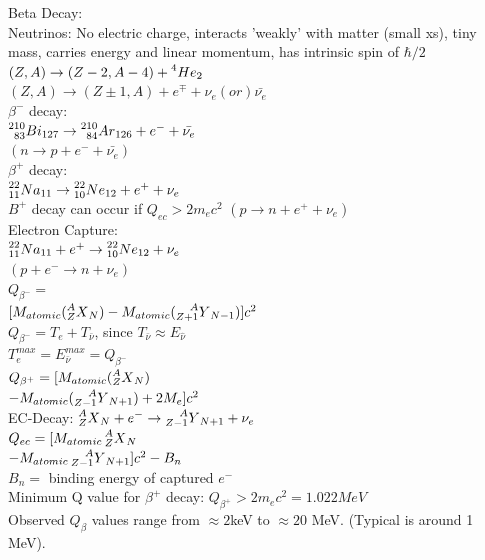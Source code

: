 \documentclass{article}
\begin{document}
\begin{multicols}{3}
Beta Decay:\\
Neutrinos: No electric charge, interacts 'weakly' with matter (small xs), tiny mass, carries energy and linear momentum, has intrinsic spin of $\hbar /2$\\
$(Z,A) \rightarrow (Z-2,A-4) + \prescript{4}{}{He}_{2}$\\
$(Z,A) \rightarrow (Z\pm 1, A) + e^{\mp} + \nu_{e} (or) \bar{\nu_{e}}$\\
$\beta^{-}$ decay: \\
\hspace*{0.01\textwidth} $\prescript{210}{83}{Bi}_{127} \rightarrow \prescript{210}{84}{Ar}_{126} + e^{-} + \bar{\nu_{e}}$\\
\hspace*{0.01\textwidth} $(n\rightarrow p + e^{-} + \bar{\nu_{e}})$\\
$\beta^{+}$ decay: \\
\hspace*{0.01\textwidth} $\prescript{22}{11}{Na}_{11} \rightarrow \prescript{22}{10}{Ne}_{12} + e^{+} + \nu_{e}$\\
$B^{+}$ decay can occur if $Q_{ec} > 2m_{e}c^{2}$
\hspace*{0.01\textwidth} $(p\rightarrow n + e^{+} + \nu_{e})$\\
Electron Capture:\\
\hspace*{0.01\textwidth} $\prescript{22}{11}{Na}_{11} + e^{+} \rightarrow \prescript{22}{10}{Ne}_{12} + \nu_{e}$\\
\hspace*{0.01\textwidth} $(p + e^{-}\rightarrow n + \nu_{e})$\\
$Q_{\beta^{-}} = $\\$[M_{atomic}(\prescript{A}{Z}{X}_{N})-M_{atomic}(\prescript{A}{Z+1}{Y}_{N-1})]c^{2}$\\
$Q_{\beta^{-}} = T_{e} + T_{\bar{\nu}}$, since $T_{\bar{\nu}} \approx E_{\hat{\nu}}$\\
$T_{e}^{max} = E_{\bar{\nu}}^{max} = Q_{\beta^{-}}$\\
$Q_{\beta^{+}} = [M_{atomic}(\prescript{A}{Z}{X}_{N})$\\$ - M_{atomic}(\prescript{A}{Z-1}{Y}_{N+1}) + 2M_{e}]c^{2}$\\
EC-Decay: $\prescript{A}{Z}{X}_{N} + e^{-} \rightarrow \prescript{A}{Z-1}{Y}_{N+1} + \nu_{e}$\\
$Q_{ec} = [M_{atomic}\prescript{A}{Z}{X}_{N} $\\$ - M_{atomic}\prescript{A}{Z-1}{Y}_{N+1}]c^{2} - B_{n}$\\
$B_{n} = $ binding energy of captured $e^{-}$\\
Minimum Q value for $\beta^{+}$ decay: $Q_{\beta^{+}} > 2m_{e}c^2 = 1.022MeV$\\
Observed $Q_{\beta}$ values range from $\approx 2$keV to $\approx 20$ MeV. (Typical is around 1 MeV). 


\end{multicols}
\end{document}
